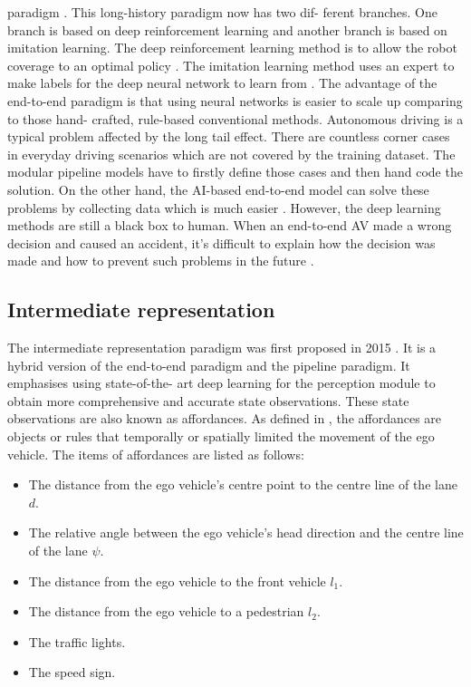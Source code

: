 \documentclass[conference]{IEEEtran}
\begin{document}
paradigm \cite{pomerleau1988alvinn}. This long-history paradigm now has two dif- ferent branches. One branch is based on deep reinforcement learning and another branch is based on imitation learning. The deep reinforcement learning method is to allow the robot coverage to an optimal policy \cite{sutton2018reinforcement}. The imitation learning method uses an expert to make labels for the deep neural network to learn from \cite{argall2009survey}.
The advantage of the end-to-end paradigm is that using neural networks is easier to scale up comparing to those hand- crafted, rule-based conventional methods. Autonomous driving is a typical problem affected by the long tail effect. There are countless corner cases in everyday driving scenarios which are not covered by the training dataset. The modular pipeline models have to firstly define those cases and then hand code the solution. On the other hand, the AI-based end-to-end model can solve these problems by collecting data which is much easier \cite{hawke2021reimagining}.
However, the deep learning methods are still a black box to human. When an end-to-end AV made a wrong decision and caused an accident, it's difficult to explain how the decision was made and how to prevent such problems in the future \cite{tampuu2020survey}.

\subsection{Intermediate representation}
The intermediate representation paradigm was first proposed in 2015 \cite{chen2015deepdriving}. It is a hybrid version of the end-to-end paradigm and the pipeline paradigm. It emphasises using state-of-the- art deep learning for the perception module to obtain more comprehensive and accurate state observations. These state observations are also known as affordances. As defined in \cite{sauer2018conditional}, the affordances are objects or rules that temporally or spatially limited the movement of the ego vehicle. The items of affordances are listed as follows:

\begin{itemize}
  \item The distance from the ego vehicle's centre point to the centre line of the lane $d$.
  \item The relative angle between the ego vehicle's head direction and the centre line of the lane $\psi$.
  \item The distance from the ego vehicle to the front vehicle $l_1$.
  \item The distance from the ego vehicle to a pedestrian $l_2$.
  \item The traffic lights.
  \item The speed sign.
\end{itemize}
\end{document}
